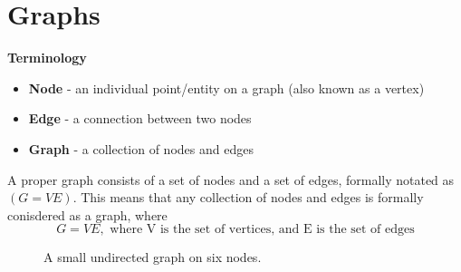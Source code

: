 \newpage
\appendix

\section{Graphs}
\textbf{Terminology}
\begin{itemize}
  \item \textbf{Node} - an individual point/entity on a graph (also known as a vertex) 
  \item \textbf{Edge} - a connection between two nodes 
  \item \textbf{Graph} - a collection of nodes and edges
\end{itemize}
A proper graph consists of a set of nodes and a set of edges, formally notated as $(G = VE)$. This means that any collection of nodes and edges is formally conisdered as a graph, where
\[
  G = VE, \text{ where V is the set of vertices, and E is the set of edges}
\]

\begin{figure}[htbp]
  \centering
  \caption{A small undirected graph on six nodes.}
  \label{fig:tikz-graph}
\end{figure}
